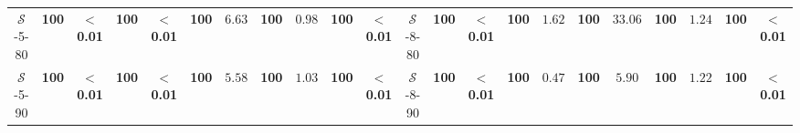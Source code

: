 \begin{table}[t]
{\begin{tabular}{ccccccccccc|ccccccccccc}
            $\mathcal{S}$-5-80 & \textbf{100} & $\mathbf{<}$\textbf{0.01} & \textbf{100} & $\mathbf{<}$\textbf{0.01} & \textbf{100} & $6.63$ & \textbf{100} & $0.98$ & \textbf{100} & $\mathbf{<}$\textbf{0.01} & 
            $\mathcal{S}$-8-80 & \textbf{100} & $\mathbf{<}$\textbf{0.01} & \textbf{100} & $1.62$ & \textbf{100} & $33.06$ & \textbf{100} & $1.24$ & \textbf{100} & $\mathbf{<}$\textbf{0.01} \\
            $\mathcal{S}$-5-90 & \textbf{100} & $\mathbf{<}$\textbf{0.01} & \textbf{100} & $\mathbf{<}$\textbf{0.01} & \textbf{100} & $5.58$ & \textbf{100} & $1.03$ & \textbf{100} & $\mathbf{<}$\textbf{0.01} & 
            $\mathcal{S}$-8-90 & \textbf{100} & $\mathbf{<}$\textbf{0.01} & \textbf{100} & $0.47$ & \textbf{100} & $5.90$ & \textbf{100} & $1.22$ & \textbf{100} & $\mathbf{<}$\textbf{0.01} \\


\end{tabular}}
\end{table}
